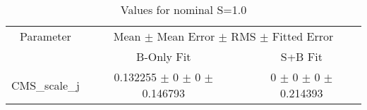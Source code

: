 \begin{table}
\centering
\caption{Values for nominal S=1.0}
\begin{tabular}{ccc}
\toprule
Parameter & \multicolumn{2}{c}{Mean $\pm$ Mean Error $\pm$ RMS $\pm$ Fitted Error}\\
 & B-Only Fit & S+B Fit\\
\midrule
CMS\_scale\_j & \num{0.132255} $\pm$ \num{0} $\pm$ \num{0} $\pm$ \num{0.146793} & \num{0} $\pm$ \num{0} $\pm$ \num{0} $\pm$ \num{0.214393}\\
\bottomrule
\end{tabular}
\end{table}